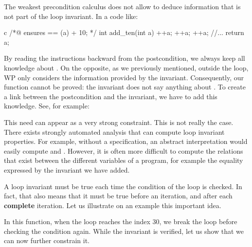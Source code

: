 


The weakest precondition calculus does not allow to deduce information
that is not part of the loop invariant. In a code like:



\begin{CodeBlock}{c}
/*@
    ensures \result == \old(a) + 10;
*/
int add_ten(int a){
    ++a;
    ++a;
    ++a;
    //...
    return a;
}
\end{CodeBlock}


By reading the instructions backward
from the postcondition, we always keep all knowledge about . On
the opposite, as we previously mentioned, outside the loop, WP only
considers the information provided by the invariant. Consequently, our
 function cannot be proved: the invariant does not say anything
about . To create a link between the postcondition and the
invariant, we have to add this knowledge. See, for example:






\begin{Information}
  This need can appear as a very strong constraint. This is not really the
  case. There exists strongly automated analysis that can compute loop
  invariant properties. For example, without a specification, an abstract
  interpretation would easily compute 
  and .
  However, it is often more difficult to compute the relations
  that exist between the different variables of a program, for
  example the equality expressed by the invariant we have
  added.
\end{Information}





A loop invariant must be true each time the condition of the loop is checked. In
fact, that also means that it must be true before an iteration, and after
each \textbf{complete} iteration. Let us illustrate on an example this
important idea.






In this function, when the loop reaches the index 30, we break the loop before
checking the condition again. While the invariant is verified, let us show
that we can now further constrain it.



